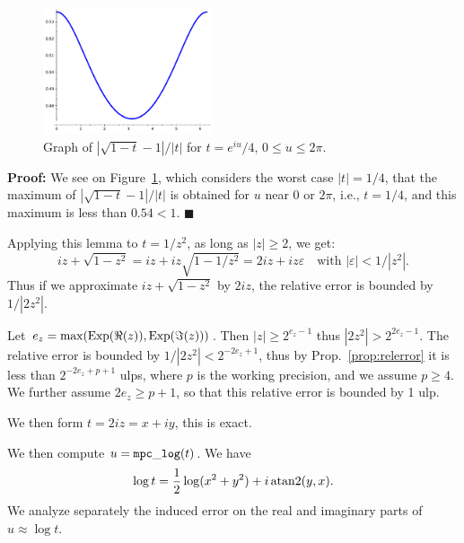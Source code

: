 \documentclass [11pt]{article}
\DeclareMathOperator{\Exp}{\operatorname {Exp}}
\renewcommand {\epsilon}{\varepsilon}
\newenvironment{proof}{\noindent \textbf {Proof:}}{{\hspace* {\fill}$\blacksquare$}}
\begin{document}
\begin{figure}[htp]

  \centerline{\includegraphics[width=5cm]{fig_lemma17.pdf}}
  \caption{Graph of $|\sqrt{1-t}-1|/|t|$ for
    $t = e^{iu}/4$, $0 \le u \le 2\pi$.} \label{fig_lemma17}
\end{figure}  

\begin{proof}
  We see on Figure~\ref{fig_lemma17}, which considers the worst case
  $|t| = 1/4$, that the maximum of $|\sqrt{1-t}-1|/|t|$
  is obtained for $u$ near $0$ or $2\pi$,
  i.e., $t = 1/4$, and this maximum is less than $0.54 < 1$.
\end{proof}

Applying this lemma to $t = 1/z^2$, as long as $|z| \ge 2$, we get:
\[ iz + \sqrt{1-z^2} = iz + iz \sqrt{1-1/z^2}
  = 2iz + iz \epsilon \quad
  \mbox{with $|\varepsilon| < 1/|z^2|$.} \]
Thus if we approximate $iz + \sqrt{1-z^2}$ by $2iz$,
the relative error is bounded by $1/|2z^2|$.

Let $e_z = {\rm max}(\Exp(\Re(z)),\Exp(\Im(z)))$.
Then $|z| \ge 2^{e_z-1}$ thus $|2z^2| > 2^{2e_z-1}$.
The relative error is bounded by $1/|2z^2| < 2^{-2e_z+1}$,
thus by Prop.~\ref{prop:relerror} it is less than $2^{-2e_z+p+1}$ ulps,
where $p$ is the working precision, and we assume $p \ge 4$.
We further assume $2e_z \ge p+1$, so that this relative error is bounded
by 1 ulp.

We then form $t = 2iz = x + iy$, this is exact.

We then compute $u = {\tt mpc\_log}(t)$.
We have
\[ \log t = \frac{1}{2} \log(x^2+y^2) + i \, {\rm atan2}(y,x). \]
We analyze separately the induced error on the real and imaginary parts
of $u \approx \log t$.
\end{document}
